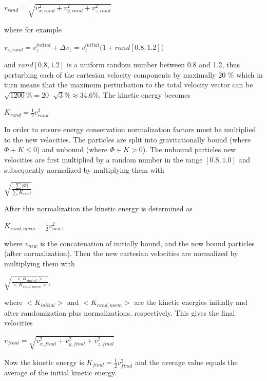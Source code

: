 \centerline{$v_{rand} = \sqrt{v_{x,rand}^2 + v_{y,rand}^2 + v_{z,rand}^2}$}

where for example 

\centerline{$v_{z,rand} = v_z^{initial} + \Delta v_z = v_z^{initial}\big( 1 + rand[0.8,1.2] \big) $}

and 	$rand[0.8,1.2]$ is a uniform random number between 0.8 and 1.2, thus perturbing each of the cartesian velocity components by maximally 20 \% which in turn means that the maximum perturbation to the total velocity vector can be $\sqrt{1200} \% = 20\cdot \sqrt{3} \% \approx 34.6 \%$.
The kinetic energy becomes 

\centerline{$K_{rand}=\frac{1}{2}v_{rand}^2$}

In order to ensure energy conservation normalization factors must be multiplied to the new velocities.
The particles are split into gravitationally bound (where $\Phi + K \leq 0 $) and unbound (where $\Phi + K > 0 $). The unbound particles new velocities are first multiplied by a random number in the range $[0.8, 1.0]$ and subsequently normalized by multiplying them with 

\centerline{$ \sqrt{\frac{ \sum |\Phi|}{ \sum K_{rand}}}$} 

After this normalization the kinetic energy is determined as 

\centerline{$K_{rand, norm}=\frac{1}{2}v_{new}^2$,} 

where $v_{new}$ is the concatenation of initially bound, and the now bound particles (after normalization).
Then the new cartesian velocities are normalized by multiplying them with 

\centerline{$ \sqrt{\frac{<K_{initial}>}{<K_{rand, norm}>}}$,} 

where $<K_{initial}>$ and $<K_{rand, norm}>$ are the kinetic energies initially and after randomization plus normalizations, respectively. This gives the final velocities 

\centerline{$v_{final} = \sqrt{v_{x,final}^2 + v_{y,final}^2 + v_{z,final}^2}$}

Now the kinetic energy is $K_{final}=\frac{1}{2}v_{final}^2$ and the average value equals the average of the initial kinetic energy.

